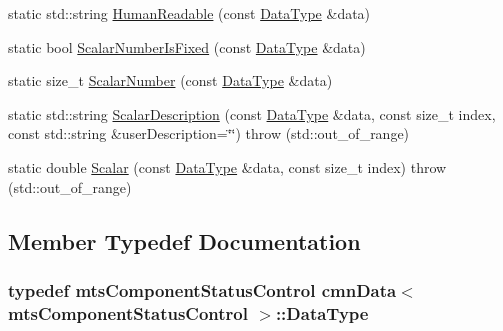 \begin{DoxyCompactItemize}
\item 
static std\-::string \hyperlink{classcmn_data_3_01mts_component_status_control_01_4_ae8db85bc0e31ad181a640cd94d50cda9}{Human\-Readable} (const \hyperlink{classcmn_data_3_01mts_component_status_control_01_4_a568a9683fdee2127ddf90cb856733c3c}{Data\-Type} \&data)
\item 
static bool \hyperlink{classcmn_data_3_01mts_component_status_control_01_4_a233898c0380b6b0057b16b9de5d4833e}{Scalar\-Number\-Is\-Fixed} (const \hyperlink{classcmn_data_3_01mts_component_status_control_01_4_a568a9683fdee2127ddf90cb856733c3c}{Data\-Type} \&data)
\item 
static size\-\_\-t \hyperlink{classcmn_data_3_01mts_component_status_control_01_4_adbadcd359d2592bec37b5d6f4860e6b7}{Scalar\-Number} (const \hyperlink{classcmn_data_3_01mts_component_status_control_01_4_a568a9683fdee2127ddf90cb856733c3c}{Data\-Type} \&data)
\item 
static std\-::string \hyperlink{classcmn_data_3_01mts_component_status_control_01_4_a49729bffd473f1b7636ee662ca44493d}{Scalar\-Description} (const \hyperlink{classcmn_data_3_01mts_component_status_control_01_4_a568a9683fdee2127ddf90cb856733c3c}{Data\-Type} \&data, const size\-\_\-t index, const std\-::string \&user\-Description=\char`\"{}\char`\"{})  throw (std\-::out\-\_\-of\-\_\-range)
\item 
static double \hyperlink{classcmn_data_3_01mts_component_status_control_01_4_a4c88a2f5544b80c379f301682fee827f}{Scalar} (const \hyperlink{classcmn_data_3_01mts_component_status_control_01_4_a568a9683fdee2127ddf90cb856733c3c}{Data\-Type} \&data, const size\-\_\-t index)  throw (std\-::out\-\_\-of\-\_\-range)
\end{DoxyCompactItemize}


\subsection{Member Typedef Documentation}
\hypertarget{classcmn_data_3_01mts_component_status_control_01_4_a568a9683fdee2127ddf90cb856733c3c}{
\subsubsection[{Data\-Type}]{\setlength{\rightskip}{0pt plus 5cm}typedef {\bf mts\-Component\-Status\-Control} {\bf cmn\-Data}$<$ {\bf mts\-Component\-Status\-Control} $>$\-::{\bf Data\-Type}}}\label{classcmn_data_3_01mts_component_status_control_01_4_a568a9683fdee2127ddf90cb856733c3c}


